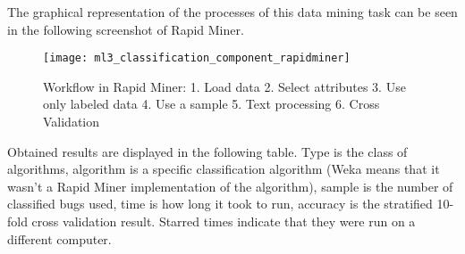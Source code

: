 The graphical representation of the processes of this data mining task can be seen in the following screenshot of Rapid Miner.

\begin{figure}
\begin{center}
\texttt{[image: ml3\_classification\_component\_rapidminer]}
\caption{Workflow in Rapid Miner: 1. Load data 2. Select attributes 3. Use only labeled data 4. Use a sample 5. Text processing 6. Cross Validation}
\end{center}
\end{figure}

Obtained results are displayed in the following table. Type is the class of algorithms, algorithm is a specific classification algorithm (Weka means that it wasn't a Rapid Miner implementation of the algorithm), sample is the number of classified bugs used, time is how long it took to run, accuracy is the stratified 10-fold cross validation result. Starred times indicate that they were run on a different computer.
\\
\\
